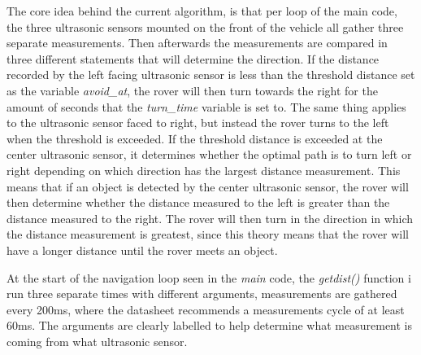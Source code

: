 The core idea behind the current algorithm, is that per loop of the main code, the three ultrasonic sensors mounted on the front of the vehicle all gather three separate measurements. Then afterwards the measurements are compared in three different statements that will determine the direction. If the distance recorded by the left facing ultrasonic sensor is less than the threshold distance set as the variable \textit{avoid\_at}, the rover will then turn towards the right for the amount of seconds that the \textit{turn\_time} variable is set to. The same thing applies to the ultrasonic sensor faced to right, but instead the rover turns to the left when the threshold is exceeded.
If the threshold distance is exceeded at the center ultrasonic sensor, it determines whether the optimal path is to turn left or right depending on which direction has the largest distance measurement. This means that if an object is detected by the center ultrasonic sensor, the rover will then determine whether the distance measured to the left is greater than the distance measured to the right. The rover will then turn in the direction in which the distance measurement is greatest, since this theory means that the rover will have a longer distance until the rover meets an object.



At the start of the navigation loop seen in the \textit{main} code, the \textit{getdist()} function i run three separate times with different arguments, measurements are gathered every 200ms, where the datasheet recommends a measurements cycle of at least 60ms. The arguments are clearly labelled to help determine what measurement is coming from what ultrasonic sensor.

